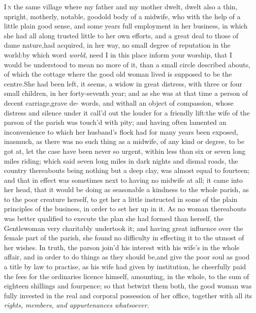 \documentclass{article}
\begin{document}
\lettrine{I}{\,n} the same village where my father
and my mother dwelt, dwelt also a thin, upright, motherly, notable,
good\break old body of a midwife, who with the help of a little plain
good sense, and some years full employment in her business, in
which she had all along trusted little to her own efforts, and a
great deal to those of dame nature,\tsk  had acquired, in her way,
no small degree of reputation in the world:\tsk  by which word
\textit{world}, need I in this place inform your worship,
that I would be understood to mean no 
more of it, than a small circle described 
abouts, of which the cottage where the good old woman lived is supposed to be
the centre.\tsh  She had been left, it seems, a widow in great distress, with three or
four small children, in her forty-seventh year; and as she was at that time a person
of decent carriage,\tsk  grave de-\break
{}
words, and
withall an object of compassion, whose distress and silence under it call’d out the
louder for a friendly lift:\break the wife of the parson of the parish was touch’d with
pity; and having often la\-mented an inconvenience to which her husband’s flock had
for many years been exposed, inasmuch, as there was no such thing as a midwife, of
any kind or degree, to be got at, let the case have been never so urgent, within
less than six or seven long miles riding; which said seven long miles in dark nights
and dismal roads, the country thereabouts being nothing but a deep clay, was almost
equal to fourteen; and that in effect was sometimes next to having no midwife at
all; it came into her head, that it would be doing as seasonable a kindness to the
whole parish, as to the poor creature herself, to get her a little instructed in
some of the plain principles of the business, in order to set her up in it. As no
woman thereabouts was better qualified to execute the plan she had formed than
herself, the Gentle\-woman very charitably undertook it; and having great influence
over the female part of the parish, she found no difficulty in effecting it to the
utmost of her wishes. In truth, the parson join’d his interest with his wife’s in
the whole affair, and in order to do things as they should be,\break and give the poor
soul as good a title by law to practise, as his wife had given by institution,\tsk
he cheerfully paid the fees for the ordinaries licence himself, amounting, in the
whole, to the sum of eighteen shillings and fourpence; so that betwixt them both,
the good woman was fully invested in the real and corporal possession of her office,
together with all its \textit{rights, members, and appurtenances whatsoever.}
\end{document}
